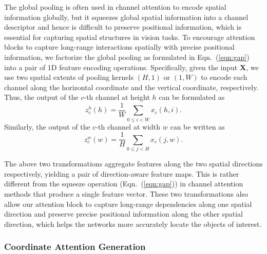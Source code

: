 \documentclass[final]{cvpr}
\begin{document}
The global pooling is often used in channel attention to encode spatial information globally, but it squeezes global spatial information into a channel descriptor and hence is difficult to preserve positional information, which is essential for capturing spatial structures in vision tasks.
%
To encourage attention blocks to capture long-range interactions spatially with precise positional information,
we factorize the global pooling as formulated in Eqn.~(\ref{eqn:gap})
into a pair of 1D feature encoding operations. 
%
Specifically, given the input $\mathbf{X}$, we use two spatial extents of pooling kernels $(H, 1)$ or $(1, W)$ to encode each channel along the horizontal coordinate and the vertical coordinate, respectively.
%
Thus, the output of the $c$-th channel at height $h$ can be formulated as
\begin{equation} \label{eqn:pool_h}
z_{c}^h(h) = \frac{1}{W} \sum_{0 \le i < W}x_c(h, i).
\end{equation}
Similarly, the output of the $c$-th channel at width $w$ can be written as
\begin{equation} \label{eqn:pool_v}
z_{c}^w(w) = \frac{1}{H} \sum_{0 \le j < H}x_c(j, w).
\end{equation}


The above two transformations aggregate features along the two spatial directions respectively, yielding a pair of direction-aware feature maps.
%
This is rather different from the squeeze operation (Eqn.~(\ref{eqn:gap})) in channel attention methods
that produce a single feature vector.
%
These two transformations also allow our attention block to capture long-range dependencies along one spatial direction and preserve precise positional information along the other spatial direction, which helps the networks more accurately locate the objects of interest.
%
%

\subsubsection{Coordinate Attention Generation}
\end{document}
